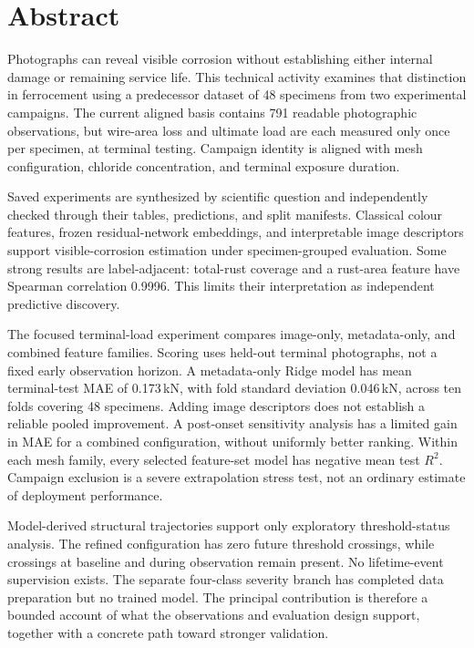\chapter*{Abstract}
Photographs can reveal visible corrosion without establishing either internal damage or remaining service life. This technical activity examines that distinction in ferrocement using a predecessor dataset of 48 specimens from two experimental campaigns. The current aligned basis contains 791 readable photographic observations, but wire-area loss and ultimate load are each measured only once per specimen, at terminal testing. Campaign identity is aligned with mesh configuration, chloride concentration, and terminal exposure duration.

Saved experiments are synthesized by scientific question and independently checked through their tables, predictions, and split manifests. Classical colour features, frozen residual-network embeddings, and interpretable image descriptors support visible-corrosion estimation under specimen-grouped evaluation. Some strong results are label-adjacent: total-rust coverage and a rust-area feature have Spearman correlation 0.9996. This limits their interpretation as independent predictive discovery.

The focused terminal-load experiment compares image-only, metadata-only, and combined feature families. Scoring uses held-out terminal photographs, not a fixed early observation horizon. A metadata-only Ridge model has mean terminal-test MAE of 0.173\,kN, with fold standard deviation 0.046\,kN, across ten folds covering 48 specimens. Adding image descriptors does not establish a reliable pooled improvement. A post-onset sensitivity analysis has a limited gain in MAE for a combined configuration, without uniformly better ranking. Within each mesh family, every selected feature-set model has negative mean test $R^2$. Campaign exclusion is a severe extrapolation stress test, not an ordinary estimate of deployment performance.

Model-derived structural trajectories support only exploratory threshold-status analysis. The refined configuration has zero future threshold crossings, while crossings at baseline and during observation remain present. No lifetime-event supervision exists. The separate four-class severity branch has completed data preparation but no trained model. The principal contribution is therefore a bounded account of what the observations and evaluation design support, together with a concrete path toward stronger validation.

